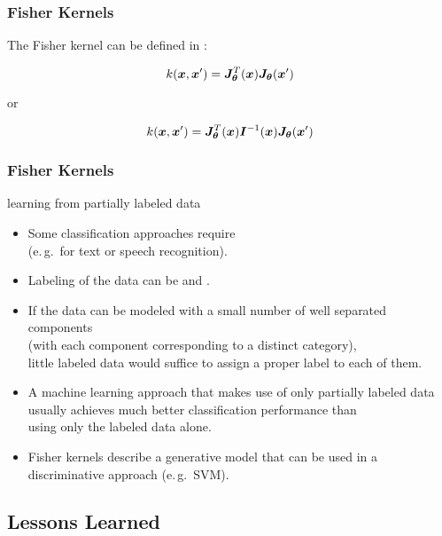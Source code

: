 \begin{frame}
	\frametitle{Fisher Kernels \cont}

	The Fisher kernel can be defined in :

	\begin{displaymath}
		k({\bm x}, {\bm x}') = {\bm J}_{{\bm \theta}}^T({\bm x}) {\bm J}_{{\bm \theta}}({\bm x}')
	\end{displaymath}

	or

	\begin{displaymath}
		k({\bm x}, {\bm x}') =  {\bm J}_{{\bm \theta}}^T({\bm x})    {\bm I} ^{-1}({\bm x}) {\bm J}_{{\bm \theta}}({\bm x}')
	\end{displaymath}
\end{frame}


\begin{frame}
	\frametitle{Fisher Kernels \cont}

	 learning from partially labeled data \pause

	\small
	\begin{itemize}
		\item Some classification approaches require  \\
		      (e.\,g.\ for text or speech recognition). \pause
		\item Labeling of the data can be  and . \pause
		\item If the data can be modeled with a small number of well separated components \\
		      (with each component corresponding to a distinct category), \\
		      little labeled data would suffice to assign a proper label to each of them. \pause
		\item A machine learning approach that makes use of only partially labeled data \\
		      usually achieves much better classification performance than \\
		      using only the labeled data alone. \pause
		\item Fisher kernels describe a generative model that can be used in a discriminative approach (e.\,g.\ SVM).
	\end{itemize}
\end{frame}


\subsection{Lessons Learned}


